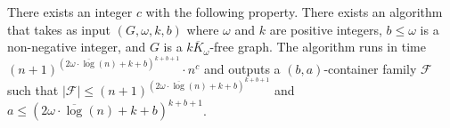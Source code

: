 \documentclass[10pt,a4paper]{amsart}
\newcommand{\cal}{\mathcal}
\begin{document}
\begin{lemma}\label{lem:containers1}
There exists an integer $c$ with the following property.
There exists an algorithm that takes as input $(G, \omega, k, b)$ where $\omega$ and $k$ are positive integers, $b \leq \omega$ is a non-negative integer, and $G$ is a $\overline{kK_\omega}$-free graph.
The algorithm runs in time $(n+1)^{  {(2\omega \cdot \overline{\log} (n) + k+ b)^{k+b+1}}} \cdot n^c$ and outputs a
$(b, a)$-container family ${\cal F}$ such that $|{\cal F}| \leq (n+1)^{  {(2\omega \cdot \overline{\log} (n) + k+b)^{k+b+1} }}$ and $a \leq  (2 \omega \cdot \overline{\log}(n) + k+b)^{k+b+1}$.
\end{lemma} 
\end{document}
